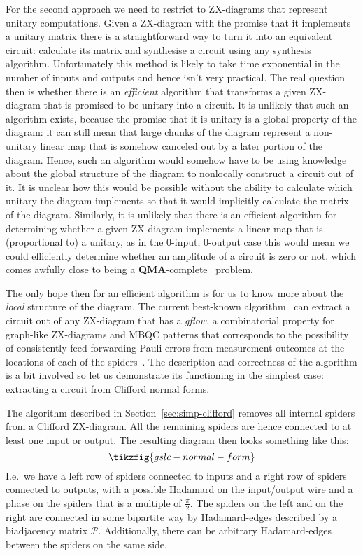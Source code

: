 \documentclass[a4paper,onecolumn,superscriptaddress,11pt,%
				unpublished,%
				allowfontchageintitle,%
				]{quantumarticle}
\begin{document}
For the second approach we need to restrict to ZX-diagrams that represent unitary computations. Given a ZX-diagram with the promise that it implements a unitary matrix there is a straightforward way to turn it into an equivalent circuit: calculate its matrix and synthesise a circuit using any synthesis algorithm. Unfortunately this method is likely to take time exponential in the number of inputs and outputs and hence isn't very practical. The real question then is whether there is an \emph{efficient} algorithm that transforms a given ZX-diagram that is promised to be unitary into a circuit. 
It is unlikely that such an algorithm exists, because the promise that it is unitary is a global property of the diagram: it can still mean that large chunks of the diagram represent a non-unitary linear map that is somehow canceled out by a later portion of the diagram. Hence, such an algorithm would somehow have to be using knowledge about the global structure of the diagram to nonlocally construct a circuit out of it. It is unclear how this would be possible without the ability to calculate which unitary the diagram implements so that it would implicitly calculate the matrix of the diagram.
Similarly, it is unlikely that there is an efficient algorithm for determining whether a given ZX-diagram implements a linear map that is (proportional to) a unitary, as in the 0-input, 0-output case this would mean we could efficiently determine whether an amplitude of a circuit is zero or not, which comes awfully close to being a \textbf{QMA}-complete~\cite{bookatz2012qmacomplete} problem.

The only hope then for an efficient algorithm is for us to know more about the \emph{local} structure of the diagram. 
The current best-known algorithm~\cite{wetering-gflow} can extract a circuit out of any ZX-diagram that has a \emph{gflow}, a combinatorial property for graph-like ZX-diagrams and MBQC patterns that corresponds to the possibility of consistently feed-forwarding Pauli errors from measurement outcomes at the locations of each of the spiders~\cite{GFlow,DP2}. The description and correctness of the algorithm is a bit involved so let us demonstrate its functioning in the simplest case: extracting a circuit from Clifford normal forms.

The algorithm described in Section~\ref{sec:simp-clifford} removes all internal spiders from a Clifford ZX-diagram. All the remaining spiders are hence connected to at least one input or output. The resulting diagram then looks something like this:
\begin{equation}
	\tikzfig{gslc-normal-form}
\end{equation}
I.e.~we have a left row of spiders connected to inputs and a right row of spiders connected to outputs, with a possible Hadamard on the input/output wire and a phase on the spiders that is a multiple of $\frac\pi2$. The spiders on the left and on the right are connected in some bipartite way by Hadamard-edges described by a biadjacency matrix $\mathcal{P}$. Additionally, there can be arbitrary Hadamard-edges between the spiders on the same side.
\end{document}
